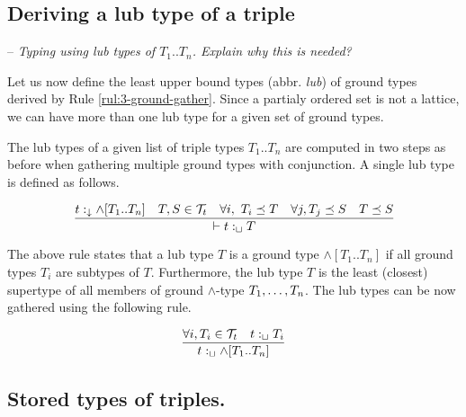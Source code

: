 \documentclass[runningheads]{llncs}
\newcommand{\darr}{\downarrow}
\newcommand{\Tt}{{\cal T}_t}
\newcommand{\nl}{\hfill\break}
\newcommand{\memo}[1]{}
\newcommand{\notes}[1]{\noindent\begin{small}-- \emph{#1}\\\end{small}}
\begin{document}
\subsection{Deriving a lub type of a triple}

\notes{Typing using lub types of $T_1..T_n$. Explain why this is needed?}

Let us now define the least upper bound types (abbr. \emph{lub}) of
ground types derived by Rule \ref{rul:3-ground-gather}. Since a
partialy ordered set is not a lattice, we can have more than one lub
type for a given set of ground types.

The lub types of a given list of triple types $T_1..T_n$ are
computed in two steps as before when gathering multiple ground types
with conjunction. A single lub type is defined as follows.

\begin{equation}
\dfrac{t:_\darr\land[T_1..T_n]\quad T,S\in\Tt\quad \forall\/i,\ T_i\preceq\/T\quad \forall\/j, T_j\preceq\/S\quad T\preceq\/S}
      {\vdash\/t:_\sqcup\/T}
\end{equation}

The above rule states that a lub type $T$ is a ground type
$\land[T_1..T_n]$ if all ground types $T_i$ are subtypes of
$T$. Furthermore, the lub type $T$ is the least (closest) supertype of
all members of ground $\land$-type $T_1,\ldots\/,T_n$. The lub types
can be now gathered using the following rule.

\begin{equation}
\dfrac{\forall i, T_i\in\Tt\quad t:_\sqcup\/T_i}
      {t:_\sqcup\land[T_1..T_n]}
\end{equation}


\memo{The types of $s$ and $o$ can be any classes $T_s$ and $T_o$ from
  ${\cal I}_c$, while the type of $p$ has to be a class $T_p$ that is
  a subclass of rdf:Property. The typing of a triple $t$ is correct
  since the interpretation of $T$ includes $t$.}

\memo{Moreover, the types $T$ that are derived by the above rule are
  minimal in the sense that given the information provided, i.e., the
  types of $t$'s components, their interpretations are minimal
  possible comparing them to the interpretations of all other derived
  types of $t$.}






\subsection{Stored types of triples.}\nl
\end{document}
